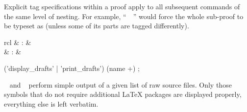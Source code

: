 \begin{isabellebody}
\begin{isamarkuptext}
  Explicit tag specifications within a proof apply to all subsequent
  commands of the same level of nesting.  For example, ``\hyperlink{command.proof}{\mbox{}}~~\hyperlink{command.qed}{\mbox{}}'' would force the
  whole sub-proof to be typeset as  (unless some of its
  parts are tagged differently).%
\end{isamarkuptext}%
\isamarkuptrue%
%
\isamarkuptrue%
%
\begin{isamarkuptext}%
\begin{matharray}{rcl}
    \hypertarget{command.display-drafts}{\hyperlink{command.display-drafts}{\mbox{}}}\isa{{\isachardoublequote}\isactrlsup {\isacharasterisk}{\isachardoublequote}} & : & \isarkeep{\cdot} \\
    \hypertarget{command.print-drafts}{\hyperlink{command.print-drafts}{\mbox{}}}\isa{{\isachardoublequote}\isactrlsup {\isacharasterisk}{\isachardoublequote}} & : & \isarkeep{\cdot} \\
  \end{matharray}

  \begin{rail}
    ('display\_drafts' | 'print\_drafts') (name +)
    ;
  \end{rail}

  \begin{descr}

  \item [\hyperlink{command.display-drafts}{\mbox{\isa{\isacommand{display{\isacharunderscore}drafts}}}}~\isa{paths} and \hyperlink{command.print-drafts}{\mbox{\isa{\isacommand{print{\isacharunderscore}drafts}}}}~\isa{paths}] perform simple output of a given list
  of raw source files.  Only those symbols that do not require
  additional {\LaTeX} packages are displayed properly, everything else
  is left verbatim.

  \end{descr}%
\end{isamarkuptext}%
\isamarkuptrue%
%
\isadelimtheory
%
\endisadelimtheory
%
\isatagtheory
{}\isamarkupfalse%
%
\endisatagtheory
{\isafoldtheory}%
%
\isadelimtheory
%
\endisadelimtheory
\isanewline
\end{isabellebody}%
